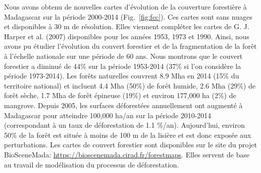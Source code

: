 \documentclass[12pt,]{article}
\begin{document}
Nous avons obtenu de nouvelles cartes d'évolution de la couverture
forestière à Madagascar sur la période 2000-2014 (Fig.~\ref{fig:fcc}).
Ces cartes sont sans nuages et disponibles à 30 m de résolution. Elles
viennent compléter les cartes de G. J. Harper et al. (2007) disponibles
pour les années 1953, 1973 et 1990. Ainsi, nous avons pu étudier
l'évolution du couvert forestier et de la fragmentation de la forêt à
l'échelle nationale sur une période de 60 ans. Nous montrons que le
couvert forestier a diminué de 44\% sur la période 1953-2014 (37\% si
l'on considère la période 1973-2014). Les forêts naturelles couvrent 8.9
Mha en 2014 (15\% du territoire national) et incluent 4.4 Mha (50\%) de
forêt humide, 2.6 Mha (29\%) de forêt sèche, 1.7 Mha de forêt épineuse
(19\%) et environ 177,000 ha (2\%) de mangrove. Depuis 2005, les
surfaces déforestées annuellement ont augmenté à Madagascar pour
atteindre 100,000 ha/an sur la période 2010-2014 (correspondant à un
taux de déforestation de 1.1 \%/an). Aujourd'hui, environ 50\% de la
forêt est située à moins de 100 m de la lisière et est donc exposée aux
perturbations. Les cartes de couvert forestier sont disponibles sur le
site du projet BioSceneMada:
\url{https://bioscenemada.cirad.fr/forestmaps}. Elles servent de base au
travail de modélisation du processus de déforestation.
\end{document}
